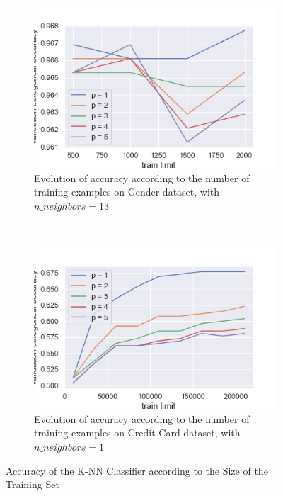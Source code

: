 \documentclass[10pt]{article}
\begin{document}
		\paragraph*{}
			\begin{figure}[h]
				\centering
				\begin{subfigure}[]{0.45\columnwidth}
					\centering
					\includegraphics[width=\linewidth]{../graphics/knn_gender_train_limit.png}
					\caption{Evolution of accuracy according to the number of training examples on Gender dataset, with $n\_neighbors = 13$}
					\label{knn:g_train_limit}
				\end{subfigure}
				~
				\begin{subfigure}[]{0.45\columnwidth}
					\centering
					\includegraphics[width=\linewidth]{../graphics/knn_creditcard_train_limit.png}
					\caption{Evolution of accuracy according to the number of training examples on Credit-Card dataset, with $n\_neighbors = 1$}
					\label{knn:cc_train_limit}
				\end{subfigure}
				\caption{Accuracy of the K-NN Classifier according to the Size of the Training Set}
				\label{knn:train_limit}
			\end{figure}
\end{document}
